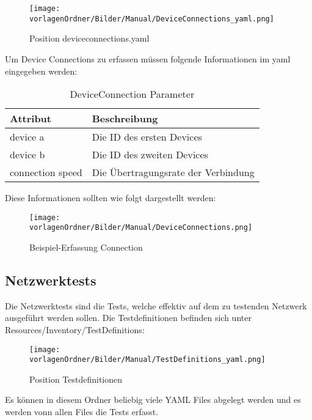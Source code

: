 \documentclass[]{subfiles}
\begin{document}
		\begin{figure}[h!]
			\begin{center}
				\texttt{[image: \\vorlagenOrdner/Bilder/Manual/DeviceConnections\_yaml.png]}
				\caption{Position deviceconnections.yaml}
			\end{center}
		\end{figure}

		Um Device Connections zu erfassen müssen folgende Informationen im yaml eingegeben werden:

		\begin{table}
			\begin{tabularx}{\textwidth}{ll}
			\toprule
			Attribut & Beschreibung \\
			\midrule
			device a & Die ID des ersten Devices \\
			device b & Die ID des zweiten Devices \\
			connection speed & Die Übertragungsrate der Verbindung\\
			\midrule
			\end{tabularx}
			\caption{DeviceConnection Parameter}
		\end{table}
		

		Diese Informationen sollten wie folgt dargestellt werden: 

		\begin{figure}[h!]
			\begin{center}
				\texttt{[image: \\vorlagenOrdner/Bilder/Manual/DeviceConnections.png]}
				\caption{Beispiel-Erfassung Connection}
			\end{center}
		\end{figure}


\subsection{Netzwerktests}
	Die Netzwerktests sind die Tests, welche effektiv auf dem zu testenden Netzwerk 
	ausgeführt werden sollen.
	Die Testdefinitionen befinden sich unter Resources/Inventory/TestDefinitions:

	\begin{figure}[h!]
		\begin{center}
			\texttt{[image: \\vorlagenOrdner/Bilder/Manual/TestDefinitions\_yaml.png]}
			\caption{Position Testdefinitionen}
		\end{center}
	\end{figure}


	Es können in diesem Ordner beliebig viele YAML Files abgelegt werden und es werden vonn allen Files die Tests erfasst.
\end{document}
